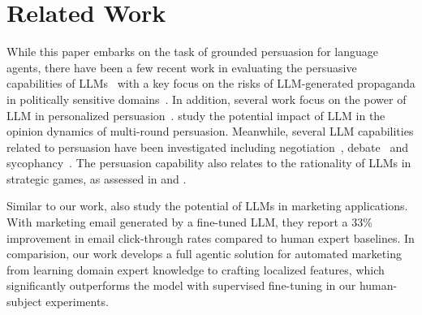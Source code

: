 \section{Related Work}
\label{sec:related}

While this paper embarks on the task of grounded persuasion for language agents, there have been a few recent work in evaluating the persuasive capabilities of LLMs~\citep{durmus2024measuring} with a key focus on the risks of LLM-generated propaganda in politically sensitive domains~\citep{voelkel2023artificial,goldstein2024persuasive, hackenburg2024evidence, luciano2024hypersuasion}. In addition, several work focus on the power of LLM in personalized persuasion~\citep{hackenburg2024evaluating,salvi2024conversational,matz2024potential}.  \citet{breum2024persuasive} study the potential impact of LLM in the opinion dynamics of multi-round persuasion. 
Meanwhile, several LLM capabilities related to persuasion have been investigated including negotiation~\citep{bianchi2024well}, debate~\citep{khan2024debating} and sycophancy~\citep{sharma2023towards, denison2024sycophancy}.  The persuasion capability also
relates to the rationality of LLMs in strategic games, 
as assessed in \citet{chen2023emergence} and \citet{ramansteer}. 

Similar to our work, \citet{angelopoulos2024value} also study the potential of LLMs in marketing applications. With marketing email generated by a fine-tuned LLM, they report a 33\% improvement in email click-through rates compared to human expert baselines. In comparision, our work develops a full agentic solution for automated marketing from learning domain expert knowledge to crafting localized features, which significantly outperforms the model with supervised fine-tuning in our human-subject experiments.